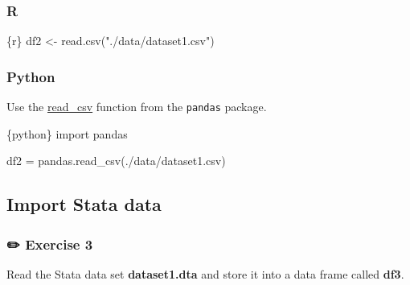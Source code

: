 \documentclass[
  letterpaper,
  DIV=11,
  numbers=noendperiod]{scrreprt}
\newenvironment{Shaded}{\begin{snugshade}}{\end{snugshade}}
\newcommand{\FunctionTok}[1]{\textcolor[rgb]{0.28,0.35,0.67}{#1}}
\newcommand{\ImportTok}[1]{\textcolor[rgb]{0.00,0.46,0.62}{#1}}
\newcommand{\InformationTok}[1]{\textcolor[rgb]{0.37,0.37,0.37}{#1}}
\newcommand{\NormalTok}[1]{\textcolor[rgb]{0.00,0.23,0.31}{#1}}
\newcommand{\OperatorTok}[1]{\textcolor[rgb]{0.37,0.37,0.37}{#1}}
\newcommand{\OtherTok}[1]{\textcolor[rgb]{0.00,0.23,0.31}{#1}}
\newcommand{\StringTok}[1]{\textcolor[rgb]{0.13,0.47,0.30}{#1}}
\begin{document}
\hypertarget{r-1}{%
\subsubsection{R}\label{r-1}}

\begin{Shaded}
\begin{Highlighting}[]
\InformationTok{\textasciigrave{}\textasciigrave{}\textasciigrave{}\{r\}}
\NormalTok{df2 }\OtherTok{\textless{}{-}} \FunctionTok{read.csv}\NormalTok{(}\StringTok{"./data/dataset1.csv"}\NormalTok{)}
\InformationTok{\textasciigrave{}\textasciigrave{}\textasciigrave{}}
\end{Highlighting}
\end{Shaded}

\hypertarget{python-1}{%
\subsubsection{Python}\label{python-1}}

Use the
\href{https://pandas.pydata.org/docs/reference/api/pandas.read_csv.html}{read\_csv}
function from the \texttt{pandas} package.

\begin{Shaded}
\begin{Highlighting}[]
\InformationTok{\textasciigrave{}\textasciigrave{}\textasciigrave{}\{python\}}
\ImportTok{import}\NormalTok{ pandas}

\NormalTok{df2 }\OperatorTok{=}\NormalTok{ pandas.read\_csv(}\StringTok{\textquotesingle{}./data/dataset1.csv\textquotesingle{}}\NormalTok{)}
\InformationTok{\textasciigrave{}\textasciigrave{}\textasciigrave{}}
\end{Highlighting}
\end{Shaded}

\hypertarget{import-stata-data}{%
\subsection{Import Stata data}\label{import-stata-data}}

\hypertarget{exercise-3}{%
\subsubsection{\texorpdfstring{{✏️} Exercise
3}{✏️ Exercise 3}}\label{exercise-3}}

Read the Stata data set \textbf{dataset1.dta} and store it into a data
frame called \textbf{df3}.
\end{document}
